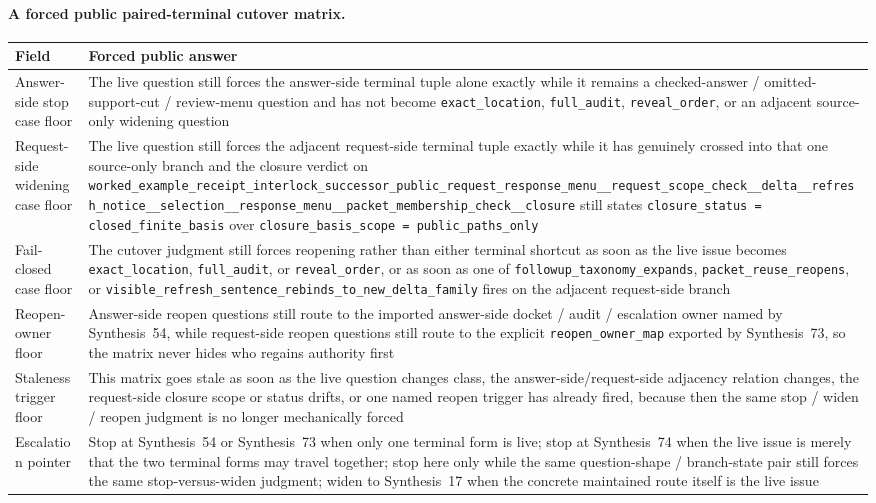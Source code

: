 \documentclass[11pt]{article}
\begin{document}
\paragraph{A forced public paired-terminal cutover matrix.}
\begin{table}[t]
\centering
\small
\begin{tabularx}{\linewidth}{@{}lX@{}}
\toprule
Field & Forced public answer \\
\midrule
Answer-side stop case floor & The live question still forces the answer-side terminal tuple alone exactly while it remains a checked-answer / omitted-support-cut / review-menu question and has not become \nolinkurl{exact_location}, \nolinkurl{full_audit}, \nolinkurl{reveal_order}, or an adjacent source-only widening question \\
Request-side widening case floor & The live question still forces the adjacent request-side terminal tuple exactly while it has genuinely crossed into that one source-only branch and the closure verdict on \nolinkurl{worked_example_receipt_interlock_successor_public_request_response_menu__request_scope_check__delta__refresh_notice__selection__response_menu__packet_membership_check__closure} still states \nolinkurl{closure_status = closed_finite_basis} over \nolinkurl{closure_basis_scope = public_paths_only} \\
Fail-closed case floor & The cutover judgment still forces reopening rather than either terminal shortcut as soon as the live issue becomes \nolinkurl{exact_location}, \nolinkurl{full_audit}, or \nolinkurl{reveal_order}, or as soon as one of \nolinkurl{followup_taxonomy_expands}, \nolinkurl{packet_reuse_reopens}, or \nolinkurl{visible_refresh_sentence_rebinds_to_new_delta_family} fires on the adjacent request-side branch \\
Reopen-owner floor & Answer-side reopen questions still route to the imported answer-side docket / audit / escalation owner named by Synthesis~54, while request-side reopen questions still route to the explicit \nolinkurl{reopen_owner_map} exported by Synthesis~73, so the matrix never hides who regains authority first \\
Staleness trigger floor & This matrix goes stale as soon as the live question changes class, the answer-side/request-side adjacency relation changes, the request-side closure scope or status drifts, or one named reopen trigger has already fired, because then the same stop / widen / reopen judgment is no longer mechanically forced \\
Escalation pointer & Stop at Synthesis~54 or Synthesis~73 when only one terminal form is live; stop at Synthesis~74 when the live issue is merely that the two terminal forms may travel together; stop here only while the same question-shape / branch-state pair still forces the same stop-versus-widen judgment; widen to Synthesis~17 when the concrete maintained route itself is the live issue \\

\end{tabularx}
\end{table}
\end{document}
